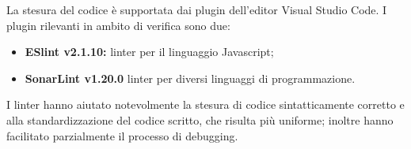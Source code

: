 La stesura del codice è supportata dai plugin dell'editor Visual Studio Code. I plugin rilevanti in ambito di verifica sono due:
\begin{itemize}
    \item \textbf{ESlint v2.1.10:}  linter per il linguaggio Javascript;
    \item \textbf{SonarLint v1.20.0}  linter per diversi linguaggi di programmazione.
\end{itemize} 

I linter hanno aiutato notevolmente la stesura di codice sintatticamente corretto e alla standardizzazione del codice scritto, che risulta più uniforme; inoltre hanno facilitato parzialmente il
processo di debugging.
